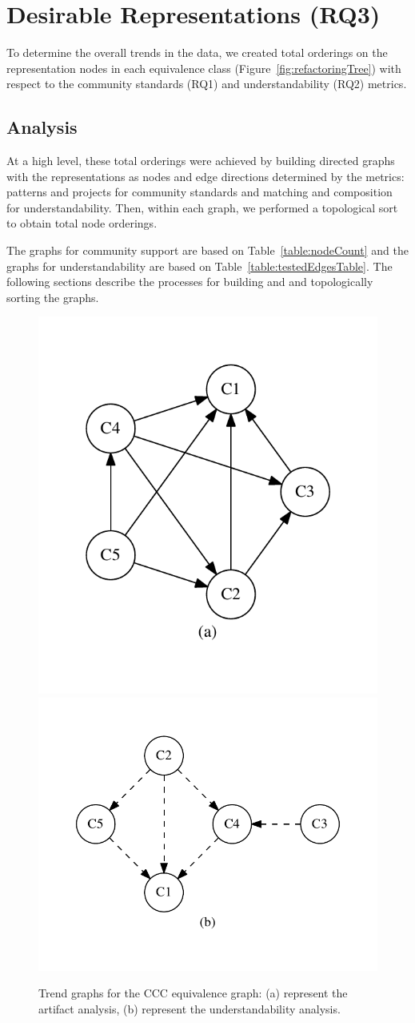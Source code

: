 

\section{Desirable Representations (RQ3)}
\label{sec:rq3}
To determine the overall trends in the data, we created total orderings on the representation nodes in each equivalence class (Figure~\ref{fig:refactoringTree})  with respect to the community standards (RQ1)  and understandability (RQ2) metrics.

\subsection{Analysis}
At a high level, these total orderings were achieved by building directed graphs with the representations as nodes and edge directions determined by the metrics: patterns and projects for community standards and matching and composition for understandability. Then, within each graph, we performed a topological sort to obtain total node orderings.

The graphs for community support are based on Table~\ref{table:nodeCount} and the graphs for understandability are based on Table~\ref{table:testedEdgesTable}. The following sections describe the processes for building and and topologically sorting the graphs.

\begin{figure}[tb]
\centering
\includegraphics[width=0.42\columnwidth]{refactoring/graphs/cart.pdf}\includegraphics[width=0.57\columnwidth]{refactoring/graphs/ccom.pdf}
\vspace{-12pt}
\caption{Trend graphs for the CCC equivalence graph: (a) represent the artifact analysis, (b) represent the understandability analysis.}

\label{fig:graphsforanalysis}
\end{figure}

